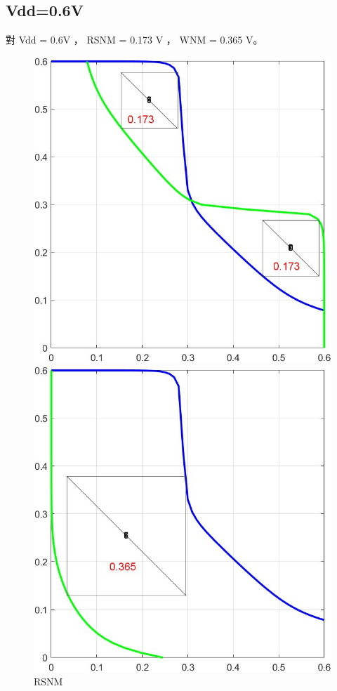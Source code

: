 \documentclass{article}
\begin{document}
  \subsection{Vdd=0.6V}

  對 Vdd = 0.6V ， RSNM = 0.173 V ， WNM = 0.365 V。

  \begin{figure}[H]
    \centering
    \begin{minipage}[t]{0.45\textwidth}
    \centering
        \includegraphics[width=\linewidth]{./img/2024-01-11-23-24-50.png}
    \caption{RSNM}
    \label{r6}
    \end{minipage}
    \qquad
    \begin{minipage}[t]{0.45\textwidth}
    \centering
        \includegraphics[width=\linewidth]{./img/2024-01-11-23-25-06.png}

\end{minipage}
\end{figure}
\end{document}
